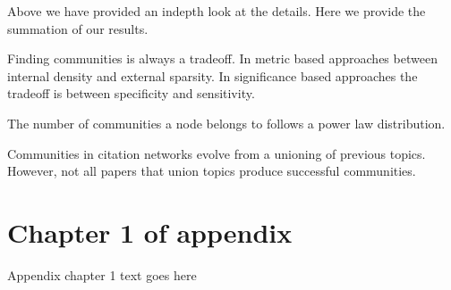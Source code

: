 \documentclass[phd,tocprelim]{cornell}
\begin{document}
Above we have provided an indepth look at the details.  Here we provide the summation of our results.

Finding communities is always a tradeoff.  In metric based approaches between internal density and external sparsity.  In significance based approaches the tradeoff is between specificity and sensitivity.

The number of communities a node belongs to follows a power law distribution.

Communities in citation networks evolve from a unioning of previous topics.  However, not all papers that union topics produce successful communities.

\cite{fort}
\cite{porter}
\cite{kanna}
\cite{newman}
\cite{duch}
\cite{blondel}
\cite{mishra}
\cite{jain}
\cite{zhang}
\cite{andersen}
\cite{capocci}
\cite{lanc:2009}
\cite{danon}
\cite{leskovec}
\cite{hui}
\cite{maiya}
\cite{lan:2008}
\cite{hastings}
\cite{leskovec:2008}
\cite{chen}
\cite{lanc:2010}
\cite{girvan}


\appendix
\chapter{Chapter 1 of appendix}
Appendix chapter 1 text goes here


\end{document}
